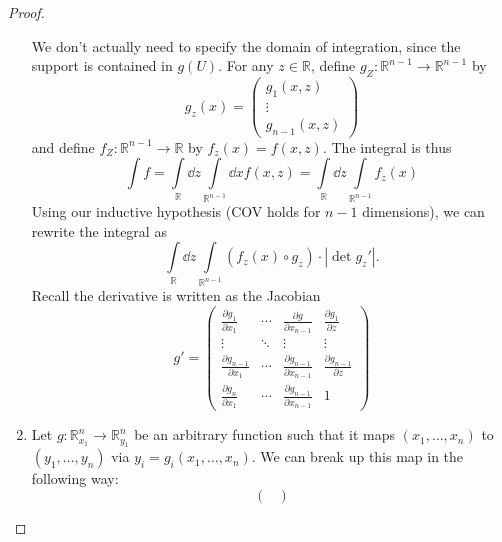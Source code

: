 \documentclass{article}
\numberwithin{equation}{section}
\begin{document}
\begin{proof}
\begin{enumerate}
        We don't actually need to specify the domain of integration, since the support is contained in $g(U).$ For any $z\in\mathbb{R}$, define $g_Z:\mathbb{R}^{n-1}\rightarrow \mathbb{R}^{n-1}$ by 
        \begin{equation}
            g_z(x) = \begin{pmatrix}
                g_1(x,z) \\ \vdots \\ g_{n-1}(x,z)
            \end{pmatrix}
        \end{equation}
        and define $f_Z:\mathbb{R}^{n-1}\rightarrow \mathbb{R}$ by $f_z(x) = f(x,z)$. The integral is thus 
        \begin{equation}
            \int f = \int\limits_{\mathbb{R}} \dd{z} \int\limits_{\mathbb{R}^{n-1}} \dd{x} f(x,z) = \int\limits_{\mathbb{R}} \dd{z} \int\limits_{\mathbb{R}^{n-1}} f_z(x)
        \end{equation}
        Using our inductive hypothesis (COV holds for $n-1$ dimensions), we can rewrite the integral as 
        \begin{equation}
            \int\limits_{\mathbb{R}} \dd{z} \int\limits_{\mathbb{R}^{n-1}} (f_z(x) \circ g_z) \cdot |\det g_z'|.
        \end{equation}
        Recall the derivative is written as the Jacobian 
        \begin{equation}
            g' = \begin{pmatrix}
                \frac{\partial g_1}{\partial x_1} & \cdots & \frac{\partial g}{\partial x_{n-1}} & \frac{\partial g_1}{\partial z} \\ 
                \vdots & \ddots & \vdots & \vdots \\
                \frac{\partial g_{n-1}}{\partial x_1} & \cdots & \frac{\partial g_{n-1}}{\partial x_{n-1}} & \frac{\partial g_{n-1}}{\partial z} \\ 
                \frac{\partial g_n}{\partial x_1} & \cdots & \frac{\partial g_{n-1}}{\partial x_{n-1}} & 1
            \end{pmatrix}
        \end{equation}
        \item Let $g:\mathbb{R}^n_{x_1}\rightarrow \mathbb{R}^n_{y_1}$ be an arbitrary function such that it maps $(x_1,\dots,x_n)$ to $(y_1,\dots,y_n)$ via $y_i = g_i(x_1,\dots,x_n)$. We can break up this map in the following way:
         \begin{equation}
             \begin{pmatrix}

\end{pmatrix}
\end{equation}
\end{enumerate}
\end{proof}
\end{document}

